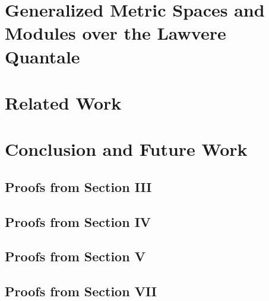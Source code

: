 \documentclass[conference]{IEEEtran}
\begin{document}
\section{Generalized Metric Spaces and Modules over the Lawvere Quantale}\label{section6}
%


\section{Related Work}\label{section7}



\section{Conclusion and Future Work}\label{section8}





\onecolumn
\appendix


\subsection{Proofs from Section III}

\newpage

\subsection{Proofs from Section IV}


\newpage
\subsection{Proofs from Section V}


\newpage
\subsection{Proofs from Section VII}

\end{document}
